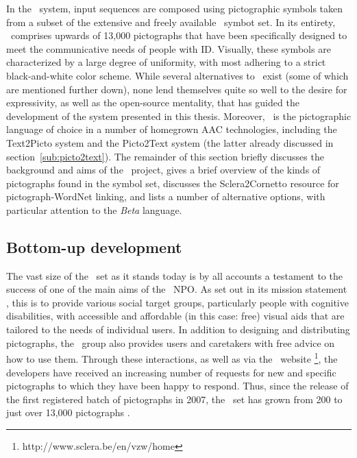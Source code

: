 In the \depicto\ system, input sequences are composed using pictographic
symbols taken from a subset of the extensive and freely available \sclera\
symbot set. In its entirety, \sclera\ comprises upwards of 13,000 pictographs
that have been specifically designed to meet the communicative needs of people
with ID. Visually, these symbols are characterized by a large degree of
uniformity, with most adhering to a strict black-and-white color scheme. While
several alternatives to \sclera\ exist (some of which are mentioned further
down), none lend themselves quite so well to the desire for expressivity, as
well as the open-source mentality, that has guided the development of the
system presented in this thesis. Moreover, \sclera\ is the pictographic
language of choice in a number of homegrown AAC technologies, including the
Text2Picto system and the Picto2Text system (the latter already discussed in
section~\ref{sub:picto2text}). The remainder of this section briefly discusses
the background and aims of the \sclera\ project, gives a brief overview of the
kinds of pictographs found in the symbol set, discusses the Sclera2Cornetto
resource for pictograph-WordNet linking, and lists a number of alternative
options, with particular attention to the \emph{Beta} language.

\subsection{Bottom-up development} %

The vast size of the \sclera\ set as it stands today is by all accounts a
testament to the success of one of the main aims of the \sclera\ NPO. As set
out in its mission statement \citep{sclera2011voorstelling}, this is to provide
various social target groups, particularly people with cognitive disabilities,
with accessible and affordable (in this case: free) visual aids that are
tailored to the needs of individual users. In addition to designing and
distributing pictographs, the \sclera\ group also provides users and caretakers
with free advice on how to use them. Through these interactions, as well as via
the \sclera\ website \footnote{http://www.sclera.be/en/vzw/home}, the
developers have received an increasing number of requests for new and specific
pictographs to which they have been happy to respond. Thus, since the release
of the first registered batch of pictographs in 2007, the \sclera\ set has
grown from 200 to just over 13,000 pictographs \citep{vandeghinste2014linking}.

